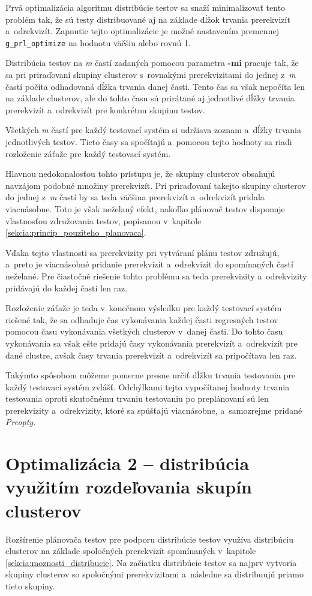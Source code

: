 Prvá optimalizácia algoritmu distribúcie testov sa snaží minimalizovať
tento problém tak, že sú testy distribuované aj na základe
dĺžok trvania prerekvizít a~odrekvizít. Zapnutie tejto optimalizácie
je možné nastavením premennej \texttt{g\_prl\_optimize} na hodnotu 
väčšiu alebo rovnú 1.

Distribúcia testov na \textit{m} častí zadaných pomocou parametra \textbf{-mi}
pracuje tak, že sa pri priraďovaní skupiny clusterov s~rovnakými prerekvizitami
do jednej z~\textit{m} častí počíta odhadovaná dĺžka trvania danej časti.
Tento čas sa však nepočíta len na základe clusterov, ale do tohto času 
sú prirátané aj jednotlivé dĺžky trvania prerekvizít a~odrekvizít pre konkrétnu 
skupinu testov.

Všetkých \textit{m} častí pre každý testovací systém si udržiava
zoznam a~dĺžky trvania jednotlivých testov. Tieto časy sa spočítajú a~pomocou
tejto hodnoty sa riadi rozloženie záťaže pre každý testovací systém.

Hlavnou nedokonalosťou tohto prístupu je, že skupiny clusterov obsahujú 
navzájom podobné množiny prerekvizít. Pri priraďovaní takejto skupiny clusterov
do jednej z~\textit{m} častí by sa teda väčšina prerekvizít a~odrekvizít
pridala viacnásobne. Toto je však neželaný efekt, nakoľko plánovač testov
disponuje vlastnosťou združovania testov, popísanou v~kapitole 
\ref{sekcia:princip_pouziteho_planovaca}.

Vďaka tejto vlastnosti sa prerekvizity pri vytváraní plánu testov 
združujú, a~preto je viacnásobné pridanie prerekvizít a~odrekvizít do 
spomínaných častí neželané.
Pre čiastočné riešenie tohto problému sa teda prerekvizity a~odrekvizity
pridávajú do každej časti len raz. 

Rozloženie záťaže je teda v~konečnom výsledku pre každý testovací systém 
riešené tak, že sa odhaduje čas vykonávania každej časti regresných testov
pomocou času vykonávania všetkých clusterov v~danej časti. 
Do tohto času vykonávania sa však ešte pridajú časy vykonávania 
prerekvizít a~odrekvizít pre dané clustre, avšak časy trvania 
prerekvizít a~odrekvizít sa pripočítava len raz.

Takýmto spôsobom môžeme pomerne presne určiť dĺžku trvania testovania
pre každý testovací systém zvlášť. Odchýlkami tejto vypočítanej hodnoty
trvania testovania oproti skutočnému trvaniu testovaniu po preplánovaní 
sú len prerekvizity a~odrekvizity, ktoré sa spúšťajú viacnásobne, 
a~samozrejme pridané \textit{Preopty}. 


\section{Optimalizácia 2 -- distribúcia využitím rozdeľovania skupín clusterov}
\label{sekcia:optimalizacia2}
Rozšírenie plánovača testov pre podporu distribúcie testov využíva 
distribúciu clusterov na základe spoločných prerekvizít spomínaných 
v~kapitole  \ref{sekcia:moznosti_distribucie}.
Na začiatku distribúcie testov sa najprv vytvoria skupiny clusterov so 
spoločnými prerekvizitami a~následne sa distribuujú priamo tieto skupiny. 

